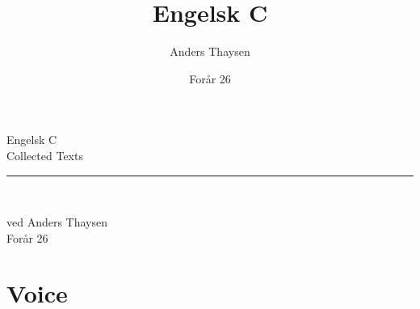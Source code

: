 \documentclass[10pt,a4paper]{book}
\title{Engelsk C}
\author{Anders Thaysen}
\date{Forår 26}
\begin{document}
\frontmatter

\begin{titlepage}
  \centering
  \vspace*{0.18\textheight}
  {\plantinb\fontsize{42}{46}\selectfont\color{hgblue}Engelsk C\\[0.4em]}
  {\plantin\Large\color{DarkSlateGray}Collected Texts\\}
  \vspace{1.5em}
  {\color{hggrey}\rule{0.45\textwidth}{0.8pt}\\}
  \vfill
  {\plantin\Large ved Anders Thaysen\\}
  {\plantin\large Forår 26}
\end{titlepage}

\tableofcontents

\mainmatter

\chapter{Voice}










%

%

%
\end{document}
